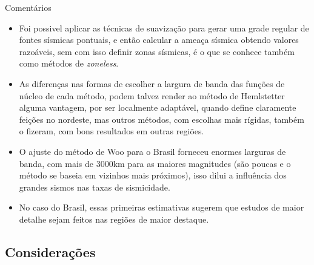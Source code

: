 \documentclass[ucs,8pt]{beamer}
\begin{document}
\begin{frame}{Comentários}
\begin{itemize}
	\item Foi possivel aplicar as técnicas de suavização para gerar uma grade regular de fontes sísmicas 
	pontuais, e então calcular a ameaça sísmica obtendo valores razoáveis, 
	sem com isso definir zonas sísmicas, é o que se conhece também como métodos de \emph{zoneless}.

	\item As diferenças nas formas de escolher a largura de banda das funções de núcleo de cada método,
	podem talvez render ao método de Hemlstetter alguma vantagem, por ser localmente adaptável,
	quando define claramente feições no nordeste, mas outros métodos, com escolhas mais rígidas,
	também o fizeram, com bons resultados em outras regiões.
	
	\item O ajuste do método de Woo para o Brasil forneceu enormes larguras de banda, com mais de 3000km para
	as maiores magnitudes (são poucas e o método se baseia em vizinhos mais próximos), isso dilui
	a influência dos grandes sismos nas taxas de sismicidade.
	
	\item No caso do Brasil, essas primeiras estimativas sugerem que estudos de maior detalhe 
	sejam feitos nas regiões de maior destaque.
\end{itemize}
\end{frame}



\subsection{Considerações}
\end{document}
